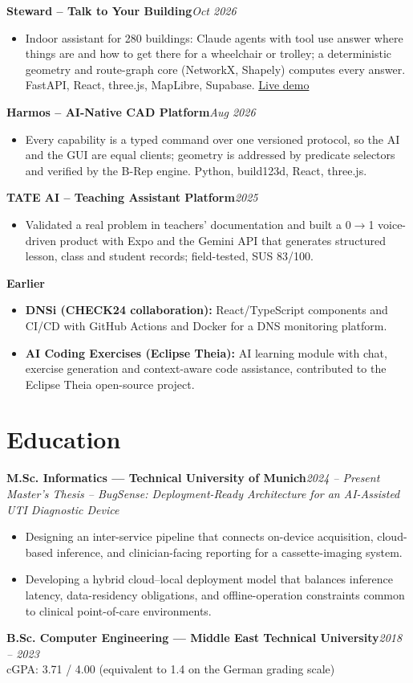 \documentclass[10pt,a4paper]{article}
\newcommand{\proj}[2]{\needspace{4\baselineskip}\textbf{#1}\hfill\textit{#2}}
\begin{document}
\proj{Steward -- Talk to Your Building}{Oct 2026}
\begin{itemize}
  \item Indoor assistant for 280 buildings: Claude agents with tool use answer where things are and how to get there
        for a wheelchair or trolley; a deterministic geometry and route-graph core (NetworkX, Shapely) computes every
        answer. FastAPI, React, three.js, MapLibre, Supabase.
        \href{https://steward-io.vercel.app}{Live demo}
\end{itemize}
\proj{Harmos -- AI-Native CAD Platform}{Aug 2026}
\begin{itemize}
  \item Every capability is a typed command over one versioned protocol, so the AI and the GUI are equal clients;
        geometry is addressed by predicate selectors and verified by the B-Rep engine. Python, build123d, React, three.js.
\end{itemize}
\proj{TATE AI -- Teaching Assistant Platform}{2025}
\begin{itemize}
  \item Validated a real problem in teachers' documentation and built a 0$\to$1 voice-driven product with Expo and the
        Gemini API that generates structured lesson, class and student records; field-tested, SUS 83/100.
\end{itemize}
\proj{Earlier}{}
\begin{itemize}
  \item \textbf{DNSi (CHECK24 collaboration):} React/TypeScript components and CI/CD with GitHub Actions and Docker for a
        DNS monitoring platform.
  \item \textbf{AI Coding Exercises (Eclipse Theia):} AI learning module with chat, exercise generation and
        context-aware code assistance, contributed to the Eclipse Theia open-source project.
\end{itemize}

\section{Education}
\textbf{M.Sc. Informatics --- Technical University of Munich}\hfill\textit{2024 -- Present}\\
\textit{Master's Thesis -- BugSense: Deployment-Ready Architecture for an AI-Assisted UTI Diagnostic Device}
\begin{itemize}
  \item Designing an inter-service pipeline that connects on-device acquisition, cloud-based inference, and
        clinician-facing reporting for a cassette-imaging system.
  \item Developing a hybrid cloud--local deployment model that balances inference latency, data-residency obligations,
        and offline-operation constraints common to clinical point-of-care environments.
\end{itemize}
\textbf{B.Sc. Computer Engineering --- Middle East Technical University}\hfill\textit{2018 -- 2023}\\
cGPA: 3.71 / 4.00 (equivalent to 1.4 on the German grading scale)
\end{document}
